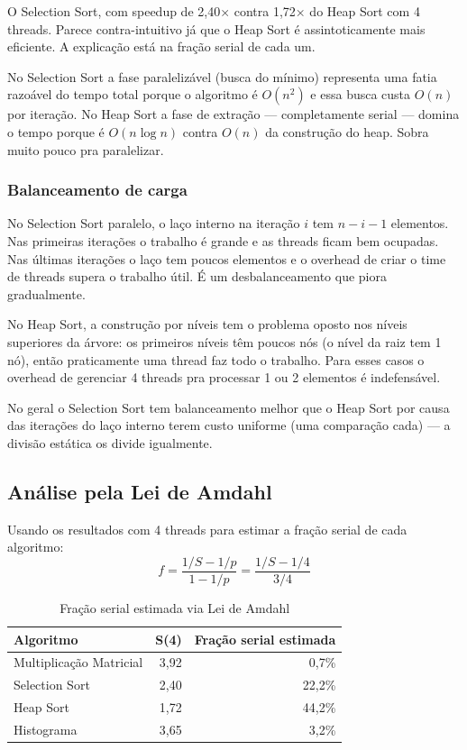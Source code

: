 \documentclass[12pt]{article}
\begin{document}
O Selection Sort, com speedup de 2,40× contra 1,72× do Heap Sort com 4 threads. Parece contra-intuitivo já que o Heap Sort é assintoticamente mais eficiente. A explicação está na fração serial de cada um.

No Selection Sort a fase paralelizável (busca do mínimo) representa uma fatia razoável do tempo total porque o algoritmo é $O(n^2)$ e essa busca custa $O(n)$ por iteração. No Heap Sort a fase de extração --- completamente serial --- domina o tempo porque é $O(n \log n)$ contra $O(n)$ da construção do heap. Sobra muito pouco pra paralelizar.

\subsubsection{Balanceamento de carga}

No Selection Sort paralelo, o laço interno na iteração $i$ tem $n-i-1$ elementos. Nas primeiras iterações o trabalho é grande e as threads ficam bem ocupadas. Nas últimas iterações o laço tem poucos elementos e o overhead de criar o time de threads supera o trabalho útil. É um desbalanceamento que piora gradualmente.

No Heap Sort, a construção por níveis tem o problema oposto nos níveis superiores da árvore: os primeiros níveis têm poucos nós (o nível da raiz tem 1 nó), então praticamente uma thread faz todo o trabalho. Para esses casos o overhead de gerenciar 4 threads pra processar 1 ou 2 elementos é indefensável.

No geral o Selection Sort tem balanceamento melhor que o Heap Sort por causa das iterações do laço interno terem custo uniforme (uma comparação cada) --- a divisão estática os divide igualmente.

\subsection{Análise pela Lei de Amdahl}

Usando os resultados com 4 threads para estimar a fração serial de cada algoritmo:
\begin{equation}
f = \frac{1/S - 1/p}{1 - 1/p} = \frac{1/S - 1/4}{3/4}
\end{equation}

\begin{table}[H]
\centering
\caption{Fração serial estimada via Lei de Amdahl}
\begin{tabular}{lrr}
\toprule
\textbf{Algoritmo} & \textbf{S(4)} & \textbf{Fração serial estimada} \\
\midrule
Multiplicação Matricial & 3,92 & 0,7\% \\
Selection Sort & 2,40 & 22,2\% \\
Heap Sort & 1,72 & 44,2\% \\
Histograma & 3,65 & 3,2\% \\
\bottomrule
\end{tabular}
\end{table}
\end{document}
